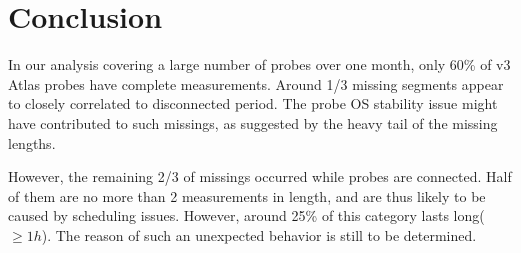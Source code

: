 \documentclass{sig-alternate-10pt}
\begin{document}
\section{Conclusion}
In our analysis covering a large number of probes over one month, only 60\% of v3 Atlas probes have complete measurements. Around 1/3 missing segments appear to closely correlated to disconnected period. The probe OS stability issue might have contributed to such missings, as suggested by the heavy tail of the missing lengths.

However, the remaining 2/3 of missings occurred while probes are connected. 
Half of them are no more than 2 measurements in length, and are thus likely to be caused by scheduling issues. However, around 25\% of this category lasts long($\geq 1h$). The reason of such an unexpected behavior is still to be determined.


\clearpage

 
\end{document}

